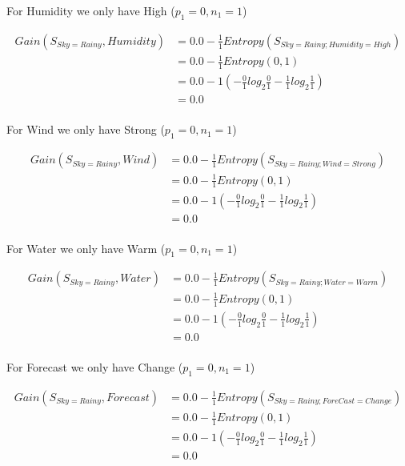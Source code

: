 \documentclass[10pt,a4paper]{article}
\begin{document}
{{{{{{{{{{For Humidity we only have High ($p_1=0,n_1=1$)

\begin{equation}
\begin{split}
Gain(S_{Sky=Rainy},Humidity) &= 0.0 - \frac{1}{1} Entropy(S_{Sky=Rainy;Humidity=High} )\\
          &= 0.0 - \frac{1}{1} Entropy(0,1) \\
          &= 0.0 - 1( -\frac{0}{1} log_2\frac{0}{1} -\frac{1}{1} log_2\frac{1}{1} )  \\
          &= 0.0 \\
\end{split}
\end{equation}

For Wind we only have Strong ($p_1=0,n_1=1$)

\begin{equation}
\begin{split}
Gain(S_{Sky=Rainy},Wind) &= 0.0 - \frac{1}{1} Entropy(S_{Sky=Rainy;Wind=Strong} )\\
          &= 0.0 - \frac{1}{1} Entropy(0,1) \\
          &= 0.0 - 1( -\frac{0}{1} log_2\frac{0}{1} -\frac{1}{1} log_2\frac{1}{1} )  \\
          &= 0.0 \\
\end{split}
\end{equation}

For Water we only have Warm ($p_1=0,n_1=1$)

\begin{equation}
\begin{split}
Gain(S_{Sky=Rainy},Water) &= 0.0 - \frac{1}{1} Entropy(S_{Sky=Rainy;Water=Warm} )\\
          &= 0.0 - \frac{1}{1} Entropy(0,1) \\
          &= 0.0 - 1( -\frac{0}{1} log_2\frac{0}{1} -\frac{1}{1} log_2\frac{1}{1} )  \\
          &= 0.0 \\
\end{split}
\end{equation}

For Forecast we only have Change ($p_1=0,n_1=1$)

\begin{equation}
\begin{split}
Gain(S_{Sky=Rainy},Forecast) &= 0.0 - \frac{1}{1} Entropy(S_{Sky=Rainy;ForeCast=Change} )\\
          &= 0.0 - \frac{1}{1} Entropy(0,1) \\
          &= 0.0 - 1( -\frac{0}{1} log_2\frac{0}{1} -\frac{1}{1} log_2\frac{1}{1} )  \\
          &= 0.0 \\
\end{split}
\end{equation}

}}}}}}}}}}
\end{document}
